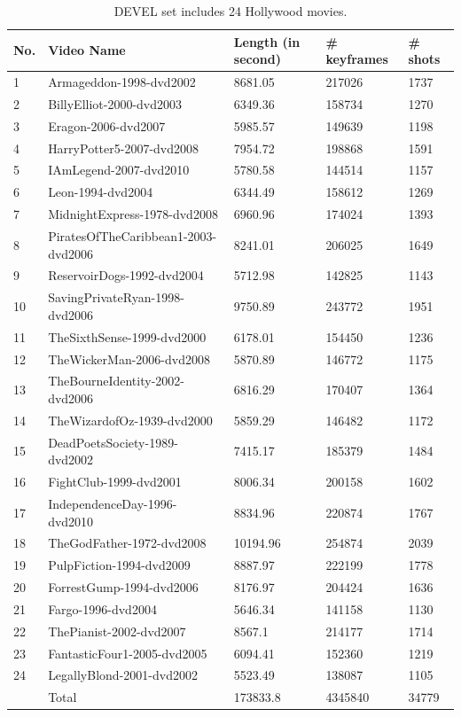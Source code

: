 \documentclass[review]{elsarticle}
\begin{document}
\begin{table}[!t]
\begin{tabular}{ |p{} | p{} | p{} | p{} | p{} | }
	\hline
	No. & Video Name & Length (in second) & \# keyframes & \# shots \\ \hline
	1 & Armageddon-1998-dvd2002 & 8681.05 & 217026 & 1737 \\ \hline
	2 & BillyElliot-2000-dvd2003 & 6349.36 & 158734 & 1270 \\ \hline
	3 & Eragon-2006-dvd2007 & 5985.57 & 149639 & 1198 \\ \hline
	4 & HarryPotter5-2007-dvd2008 & 7954.72 & 198868 & 1591 \\ \hline
	5 & IAmLegend-2007-dvd2010 & 5780.58 & 144514 & 1157 \\ \hline
	6 & Leon-1994-dvd2004 & 6344.49 & 158612 & 1269 \\ \hline
	7 & MidnightExpress-1978-dvd2008 & 6960.96 & 174024 & 1393 \\ \hline
	8 & PiratesOfTheCaribbean1-2003-dvd2006 & 8241.01 & 206025 & 1649 \\ \hline
	9 & ReservoirDogs-1992-dvd2004 & 5712.98 & 142825 & 1143 \\ \hline
	10 & SavingPrivateRyan-1998-dvd2006 & 9750.89 & 243772 & 1951 \\ \hline
	11 & TheSixthSense-1999-dvd2000 & 6178.01 & 154450 & 1236 \\ \hline
	12 & TheWickerMan-2006-dvd2008 & 5870.89 & 146772 & 1175 \\ \hline
	13 & TheBourneIdentity-2002-dvd2006 & 6816.29 & 170407 & 1364 \\ \hline
	14 & TheWizardofOz-1939-dvd2000 & 5859.29 & 146482 & 1172 \\ \hline
	15 & DeadPoetsSociety-1989-dvd2002 & 7415.17 & 185379 & 1484 \\ \hline
	16 & FightClub-1999-dvd2001 & 8006.34 & 200158 & 1602 \\ \hline
	17 & IndependenceDay-1996-dvd2010 & 8834.96 & 220874 & 1767 \\ \hline
	18 & TheGodFather-1972-dvd2008 & 10194.96 & 254874 & 2039 \\ \hline
	19 & PulpFiction-1994-dvd2009 & 8887.97 & 222199 & 1778 \\ \hline
	20 & ForrestGump-1994-dvd2006 & 8176.97 & 204424 & 1636 \\ \hline
	21 & Fargo-1996-dvd2004 & 5646.34 & 141158 & 1130 \\ \hline
	22 & ThePianist-2002-dvd2007 & 8567.1 & 214177 & 1714 \\ \hline
	23 & FantasticFour1-2005-dvd2005 & 6094.41 & 152360 & 1219 \\ \hline
	24 & LegallyBlond-2001-dvd2002 & 5523.49 & 138087 & 1105 \\ \hline
	   & Total & 173833.8 & 4345840 & 34779 \\ \hline
\end{tabular}
\caption{DEVEL set includes 24 Hollywood movies.}
\label{devel-dataset}
\end{table}
\end{document}
